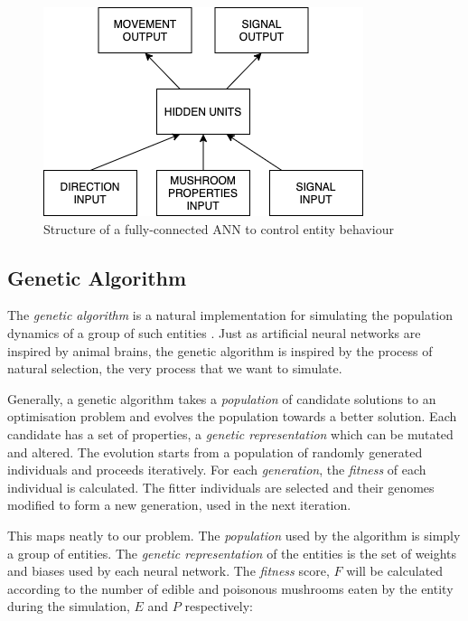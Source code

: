 \documentclass[12pt,a4paper,twoside,openright]{report}
\begin{document}
\begin{figure}[t]
  \centering
  \includegraphics[width=.6\linewidth]{figs/NeuralNets}
  \caption{Structure of a fully-connected ANN to control entity behaviour}
  \label{fig:neuralnet}
\end{figure}





\subsection{Genetic Algorithm}\label{section:genetic}

The \emph{genetic algorithm} is a natural implementation for simulating the population dynamics of a group of such entities \citep{holland1992adaptation}. Just as artificial neural networks are inspired by animal brains, the genetic algorithm is inspired by the process of natural selection, the very process that we want to simulate. 

Generally, a genetic algorithm takes a \emph{population} of candidate solutions to an optimisation problem and evolves the population towards a better solution. Each candidate has a set of properties, a \emph{genetic representation} which can be mutated and altered. The evolution starts from a population of randomly generated individuals and proceeds iteratively. For each \emph{generation}, the \emph{fitness} of each individual is calculated. The fitter individuals are selected and their genomes modified to form a new generation, used in the next iteration.

This maps neatly to our problem. The \emph{population} used by the algorithm is simply a group of entities. The \emph{genetic representation} of the entities is the set of weights and biases used by each neural network. The \emph{fitness} score, $F$ will be calculated according to the number of edible and poisonous mushrooms eaten by the entity during the simulation, $E$ and $P$ respectively:
\end{document}

